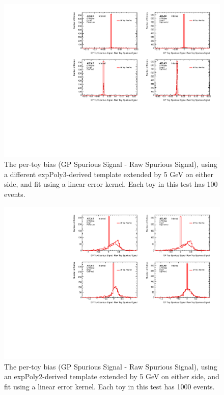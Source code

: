 \begin{figure} 
\begin{center}
  \includegraphics[width=\textwidth]{figures/background/gpr/validation/linear/ToyTest_FitSigBiases_highpT_100_noSig}   
\caption{The per-toy bias (GP Spurious Signal - Raw Spurious Signal), using a different expPoly3-derived template extended by 5 GeV on either side, and fit using a linear error kernel. Each toy in this test has 100 events.}
\label{fig:bias_linearkernel_highpt_100_noSig}
\end{center}
\end{figure}

\begin{figure} 
\begin{center}
  \includegraphics[width=\textwidth]{figures/background/gpr/validation/linear/ToyTest_FitSigBiases_lowpT_1000_noSig}   
\caption{The per-toy bias (GP Spurious Signal - Raw Spurious Signal), using an expPoly2-derived template extended by 5 GeV on either side, and fit using a linear error kernel. Each toy in this test has 1000 events.}
\label{fig:bias_linearkernel_lowpt_1000_noSig}
\end{center}
\end{figure}

